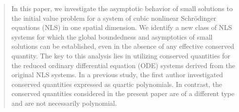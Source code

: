 \documentclass[11pt,a4paper,twosides]{amsart}
\theoremstyle{plain}
\theoremstyle{remark}
\numberwithin{equation}{section}
\theoremstyle{definition}
\newcommand{\1}{{\bf 1}_{\{|x| < |t|\}}}
\begin{document}
\begin{abstract}
%
%
In this paper, we investigate the asymptotic behavior of small solutions to the initial value problem for a system of cubic nonlinear Schr\"odinger equations (NLS) in one spatial dimension. We identify a new class of NLS systems for which the global boundedness and asymptotics of small solutions can be established, even in the absence of any effective conserved quantity. The key to this analysis lies in utilizing conserved quantities for the reduced ordinary differential equation (ODE) systems derived from the original NLS systems. In a previous study, the first author investigated conserved quantities expressed as quartic polynomials. In contrast, the conserved quantities considered in the present paper are of a different type and are not necessarily polynomial.
\end{abstract}




\end{document}
